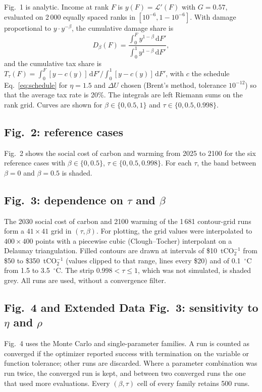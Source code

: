 \documentclass[11pt]{article}
\newcommand{\dd}{\mathrm{d}}
\newcommand{\Lor}{\mathcal{L}}
\begin{document}
Fig.~1 is analytic. Income at rank $F$ is $y(F) = \Lor'(F)$ with $G = 0.57$,
evaluated on 2\,000 equally spaced ranks in $[10^{-6}, 1-10^{-6}]$. With damage
proportional to $y\cdot y^{-\beta}$, the cumulative damage share is
\begin{equation}
  D_\beta(F) = \frac{\int_0^F y^{1-\beta}\,\dd F'}{\int_0^1 y^{1-\beta}\,\dd F'},
\end{equation}
and the cumulative tax share is $T_\tau(F) = \int_0^F [y - c(y)]\,\dd F' /
\int_0^1 [y - c(y)]\,\dd F'$, with $c$ the schedule Eq.~\eqref{eq:schedule}
for $\eta = 1.5$ and $\Delta U$ chosen (Brent's method, tolerance $10^{-12}$)
so that the average tax rate is 20\%. The integrals are left Riemann sums on
the rank grid. Curves are shown for $\beta\in\{0, 0.5, 1\}$ and
$\tau\in\{0, 0.5, 0.998\}$.

\subsection{Fig.~2: reference cases}

Fig.~2 shows the social cost of carbon and warming from 2025 to 2100 for the six
reference cases with $\beta\in\{0, 0.5\}$, $\tau\in\{0, 0.5, 0.998\}$. For each
$\tau$, the band between $\beta = 0$ and $\beta = 0.5$ is shaded.

\subsection{Fig.~3: dependence on $\tau$ and $\beta$}

The 2030 social cost of carbon and 2100 warming of the 1\,681 contour-grid runs form a
$41\times41$ grid in $(\tau,\beta)$. For plotting, the grid values were
interpolated to $400\times400$ points with a piecewise cubic
(Clough--Tocher) interpolant on a Delaunay triangulation. Filled contours are
drawn at intervals of \$10~tCO$_2^{-1}$ from \$50 to \$350~tCO$_2^{-1}$ (values
clipped to that range, lines every \$20) and of 0.1~$^\circ$C from 1.5 to
3.5~$^\circ$C. The strip $0.998<\tau\le1$, which was not simulated, is shaded
grey. All runs are used, without a convergence filter.

\subsection{Fig.~4 and Extended Data Fig.~3: sensitivity to $\eta$ and $\rho$}

Fig.~4 uses the Monte Carlo and single-parameter families. A run is counted as
converged if the optimizer reported success with termination on the variable
or function tolerance; other runs are discarded. Where a parameter
combination was run twice, the converged run is kept, and between two
converged runs the one that used more evaluations. Every
$(\beta,\tau)$ cell of every family retains 500 runs.
\end{document}
